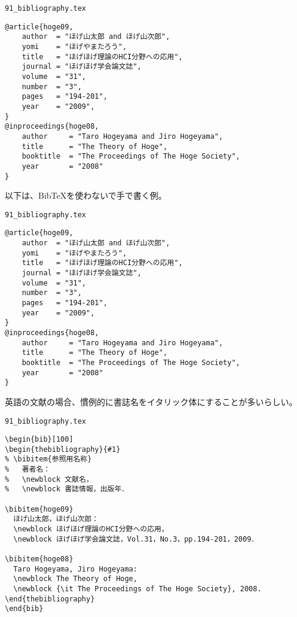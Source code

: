 \begin{itembox}[l]{{\tt 91\_bibliography.tex}}
\begin{verbatim}
@article{hoge09,
    author  = "ほげ山太郎 and ほげ山次郎",
    yomi    = "ほげやまたろう",
    title   = "ほげほげ理論のHCI分野への応用",
    journal = "ほげほげ学会論文誌",
    volume  = "31",
    number  = "3",
    pages   = "194-201",
    year    = "2009",
}
@inproceedings{hoge08,
    author     = "Taro Hogeyama and Jiro Hogeyama",
    title      = "The Theory of Hoge",
    booktitle  = "The Proceedings of The Hoge Society",
    year       = "2008"
}
\end{verbatim}
\end{itembox}


以下は、BibTeXを使わないで手で書く例。

\begin{itembox}[l]{{\tt 91\_bibliography.tex}}
\begin{verbatim}
@article{hoge09,
    author  = "ほげ山太郎 and ほげ山次郎",
    yomi    = "ほげやまたろう",
    title   = "ほげほげ理論のHCI分野への応用",
    journal = "ほげほげ学会論文誌",
    volume  = "31",
    number  = "3",
    pages   = "194-201",
    year    = "2009",
}
@inproceedings{hoge08,
    author     = "Taro Hogeyama and Jiro Hogeyama",
    title      = "The Theory of Hoge",
    booktitle  = "The Proceedings of The Hoge Society",
    year       = "2008"
}
\end{verbatim}
\end{itembox}


英語の文献の場合、慣例的に書誌名をイタリック体にすることが多いらしい。

\begin{itembox}[l]{{\tt 91\_bibliography.tex}}
\begin{verbatim}
\begin{bib}[100]
\begin{thebibliography}{#1}
% \bibitem{参照用名称}
%   著者名： 
%   \newblock 文献名，
%   \newblock 書誌情報，出版年．

\bibitem{hoge09}
  ほげ山太郎，ほげ山次郎：
  \newblock ほげほげ理論のHCI分野への応用，
  \newblock ほげほげ学会論文誌，Vol.31，No.3，pp.194-201，2009．

\bibitem{hoge08}
  Taro Hogeyama, Jiro Hogeyama:
  \newblock The Theory of Hoge,
  \newblock {\it The Proceedings of The Hoge Society}, 2008.
\end{thebibliography}
\end{bib}
\end{verbatim}
\end{itembox}


